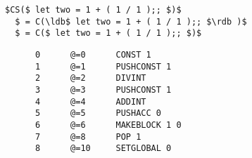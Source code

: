 \documentclass{article}
\newcommand{\ldb}{[\![}
\newcommand{\rdb}{]\!]}
\begin{document}
\lstset{language=[Objective]Caml}\begin{lstlisting}[mathescape]
  $CS($ let two = 1 + ( 1 / 1 );; $)$
  $ = C(\ldb$ let two = 1 + ( 1 / 1 );; $\rdb )$
  $ = C($ let two = 1 + ( 1 / 1 );; $)$  
\end{lstlisting}

    \begin{verbatim}
      0      @=0      CONST 1
      1      @=1      PUSHCONST 1
      2      @=2      DIVINT
      3      @=3      PUSHCONST 1
      4      @=4      ADDINT
      5      @=5      PUSHACC 0
      6      @=6      MAKEBLOCK 1 0
      7      @=8      POP 1
      8      @=10     SETGLOBAL 0
    \end{verbatim}
\end{document}
